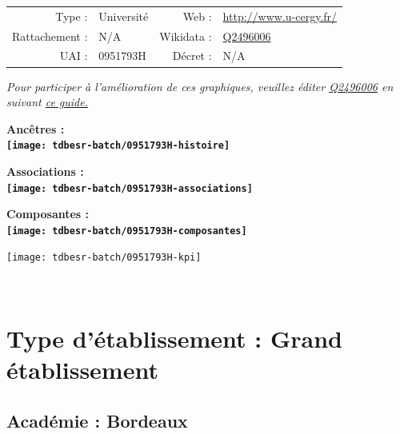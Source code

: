 \documentclass[12pt,french,]{article}
\begin{document}
\begin{tabular*}{\textwidth}{rp{5cm}rl}  
\hline  
Type : & Université & Web : &\href{http://www.u-cergy.fr/}{http://www.u-cergy.fr/} \\  
Rattachement : & N/A & Wikidata : & \href{https://www.wikidata.org/entity/Q2496006}{Q2496006} \\  
UAI : & 0951793H & Décret : & N/A \\  
\hline  
\end{tabular*}

\textit{\scriptsize Pour participer à l'amélioration de ces graphiques, veuillez éditer  \href{https://www.wikidata.org/entity/Q2496006}{Q2496006}  en suivant \href{https://github.com/cpesr/wikidataESR/blob/master/Rmd/wikidataESR.md}{ce guide.}}

\vspace{1cm}  
\begin{minipage}[b]{0.50\textwidth}\begin{center} \bf Ancêtres : \\  
\texttt{[image: tdbesr-batch/0951793H-histoire]} \end{center}\end{minipage}\begin{minipage}[b]{0.50\textwidth}\begin{center} \bf Associations : \\  
\texttt{[image: tdbesr-batch/0951793H-associations]} \end{center}\end{minipage}

\hrulefill

\begin{center} \bf Composantes : \\  
\texttt{[image: tdbesr-batch/0951793H-composantes]} \end{center}

\begin{center}\texttt{[image: tdbesr-batch/0951793H-kpi]} \end{center}\checkoddpage

\ifoddpage \fi ~\newpage  

\hypertarget{type-duxe9tablissement-grand-uxe9tablissement}{%
\section{Type d'établissement : Grand
établissement}\label{type-duxe9tablissement-grand-uxe9tablissement}}

\hypertarget{acaduxe9mie-bordeaux-1}{%
\subsection{Académie : Bordeaux}\label{acaduxe9mie-bordeaux-1}}
\end{document}
